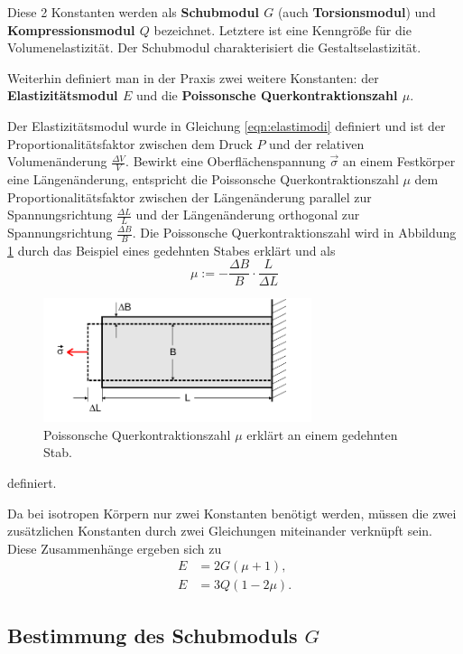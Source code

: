 Diese 2 Konstanten werden als \textbf{Schubmodul $G$} (auch \textbf{Torsionsmodul}) und
\textbf{Kompressionsmodul $Q$} bezeichnet.
Letztere ist eine Kenngröße für die Volumenelastizität. Der Schubmodul charakterisiert die
Gestaltselastizität.

Weiterhin definiert man in der Praxis zwei weitere Konstanten: der
\textbf{Elastizitätsmodul $E$} und die \textbf{Poissonsche Querkontraktionszahl $\mu$}.

Der Elastizitätsmodul wurde in Gleichung \eqref{eqn:elastimodi} definiert und ist der
Proportionalitätsfaktor zwischen dem Druck $P$ und der relativen Volumenänderung
$\frac{\Delta V}{V}$.
Bewirkt eine Oberflächenspannung $\vec{\sigma}$ an einem Festkörper eine Längenänderung,
entspricht die Poissonsche Querkontraktionszahl $\mu$ dem Proportionalitätsfaktor zwischen
der Längenänderung parallel zur Spannungsrichtung $\frac{\Delta L}{L}$ und der Längenänderung
orthogonal zur Spannungsrichtung $\frac{\Delta B}{B}$. Die Poissonsche Querkontraktionszahl
wird in Abbildung \ref{fig:querkontrakti} durch das Beispiel eines gedehnten Stabes erklärt und
als
\begin{equation*}
	\mu := - \frac{\Delta B}{B} \cdot \frac{L}{\Delta L}
\end{equation*}
\begin{figure}
	\centering
	\includegraphics[width=0.7\textwidth]{Bilder/Querkontraktion.png}
	\caption{Poissonsche Querkontraktionszahl $\mu$ erklärt an einem gedehnten Stab. \cite{Anleitung}}
	\label{fig:querkontrakti}
\end{figure}
definiert.

Da bei isotropen Körpern nur zwei Konstanten benötigt werden, müssen die zwei zusätzlichen
Konstanten durch zwei Gleichungen miteinander verknüpft sein.
Diese Zusammenhänge ergeben sich zu
\begin{align}
	E & = 2G (\mu + 1) \mathrm{,}  \\
	E & = 3Q (1 - 2\mu) \mathrm{.}
\end{align}
\FloatBarrier

\subsection{Bestimmung des Schubmoduls $G$}

